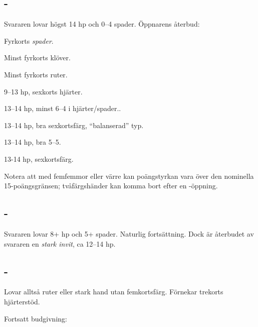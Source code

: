 \subsection{ - }

Svararen lovar högst 14 hp och 0--4 spader. Öppnarens återbud:

\begin{beskriv}
   \item[\NT{1}] Fyrkorts \emph{spader}.
   \item[\kl{2}] Minst fyrkorts klöver.
   \item[\ru{2}] Minst fyrkorts ruter.
   \item[\hj{2}] 9--13 hp, sexkorts hjärter.

   \item[\spa{2}] 13--14 hp, minst 6--4 i hjärter/spader..

   \item[\NT{2}] 13--14 hp, bra sexkortsfärg, ``balanserad'' typ.

   \item[\la{3}] 13--14 hp, bra 5--5.

   \item[\hj{3}] 13-14 hp, sexkortsf{\"a}rg.

\end{beskriv}

Notera att med femfemmor eller värre kan poängstyrkan vara över den
nominella 15-poängsgränsen; tvåfärgshänder kan komma bort efter en
-öppning.

\subsection{ - }

Svararen lovar 8+ hp och 5+ spader. Naturlig fortsättning. Dock är
återbudet  av svararen en \emph{stark invit}, ca 12--14 hp.

\subsection{ - }

Lovar alltså ruter eller stark hand utan femkortsfärg. Förnekar trekorts
hjärterstöd.

Fortsatt budgivning:

